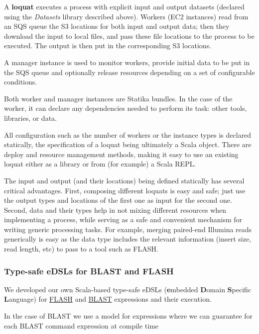 \documentclass{frontiersSCNS} %
\begin{document}
A \textbf{loquat} executes a process with explicit input and output
datasets (declared using the \emph{Datasets} library described above).
Workers (EC2 instances) read from an SQS queue the S3 locations for both
input and output data; then they download the input to local files, and
pass these file locations to the process to be executed. The output is
then put in the corresponding S3 locations.

A manager instance is used to monitor workers, provide initial data to
be put in the SQS queue and optionally release resources depending on a
set of configurable conditions.

Both worker and manager instances are Statika bundles. In the case of
the worker, it can declare any dependencies needed to perform its task:
other tools, libraries, or data.

All configuration such as the number of workers or the instance types is
declared statically, the specification of a loquat being ultimately a
Scala object. There are deploy and resource management methods, making
it easy to use an existing loquat either as a library or from (for
example) a Scala REPL.

The input and output (and their locations) being defined statically has
several critical advantages. First, composing different loquats is easy
and safe; just use the output types and locations of the first one as
input for the second one. Second, data and their types help in not
mixing different resources when implementing a process, while serving as
a safe and convenient mechanism for writing generic processing tasks.
For example, merging paired-end Illumina reads generically is easy as
the data type includes the relevant information (insert size, read
length, etc) to pass to a tool such as FLASH.

\subsubsection{Type-safe eDSLs for BLAST and
FLASH}\label{type-safe-edsls-for-blast-and-flash}

We developed our own Scala-based type-safe eDSLs (\textbf{e}mbedded
\textbf{D}omain \textbf{S}pecific \textbf{L}anguage) for
\href{https://github.com/ohnosequences/flash}{FLASH} and
\href{https://github.com/ohnosequences/blast}{BLAST} expressions and
their execution.

In the case of BLAST we use a model for expressions where we can
guarantee for each BLAST command expression at compile time
\end{document}
